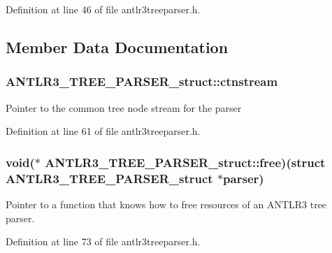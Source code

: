 Definition at line 46 of file antlr3treeparser.\-h.



\subsection{Member Data Documentation}
\hypertarget{struct_a_n_t_l_r3___t_r_e_e___p_a_r_s_e_r__struct_a3c4fe4428b6684ed143062869673d215}{
\subsubsection[{ctnstream}]{ A\-N\-T\-L\-R3\-\_\-\-T\-R\-E\-E\-\_\-\-P\-A\-R\-S\-E\-R\-\_\-struct\-::ctnstream}}\label{struct_a_n_t_l_r3___t_r_e_e___p_a_r_s_e_r__struct_a3c4fe4428b6684ed143062869673d215}
Pointer to the common tree node stream for the parser 

Definition at line 61 of file antlr3treeparser.\-h.

\hypertarget{struct_a_n_t_l_r3___t_r_e_e___p_a_r_s_e_r__struct_a6b8657813c59e7f06b6a8f4ad6a0d240}{
\subsubsection[{free}]{\setlength{\rightskip}{0pt plus 5cm}void($\ast$ A\-N\-T\-L\-R3\-\_\-\-T\-R\-E\-E\-\_\-\-P\-A\-R\-S\-E\-R\-\_\-struct\-::free)(struct {\bf A\-N\-T\-L\-R3\-\_\-\-T\-R\-E\-E\-\_\-\-P\-A\-R\-S\-E\-R\-\_\-struct} $\ast$parser)}}\label{struct_a_n_t_l_r3___t_r_e_e___p_a_r_s_e_r__struct_a6b8657813c59e7f06b6a8f4ad6a0d240}
Pointer to a function that knows how to free resources of an A\-N\-T\-L\-R3 tree parser. 

Definition at line 73 of file antlr3treeparser.\-h.

